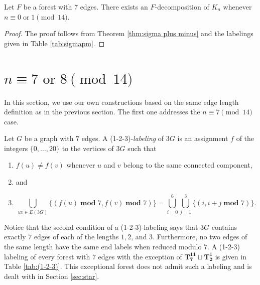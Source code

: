 \documentclass{dmgt}
\begin{document}
 


\begin{theorem}\label{thm:0 or 1 mod 14}
    Let $F$ be a forest with $7$ edges. There exists an $F$-decomposition of $K_n$ whenever $n \equiv 0 \; \textrm{or} \; 1 \pmod{14}.$
\end{theorem}
\begin{proof}
    The proof follows from Theorem \ref{thm:sigma plus minus} and the labelings given in Table \ref{tab:sigmapm}.
\end{proof}
\section{$n \equiv 7 \textrm{ or } 8 \pmod{14}$} \label{sec:7 or 8 mod 14}
In this section, we use our own constructions based on the same edge length definition as in the previous section. The first one addresses the $n \equiv 7 \pmod{14}$ case.

\begin{dnt}\label{def:1-2-3}
    Let $G$ be a graph with $7$ edges. A (1-2-3)-\emph{labeling} of $3G$ is an assignment $f$ of the integers $\{0,\dots,20\}$ to the vertices of $3G$ such that
    \begin{enumerate}
        \item $f(u) \neq f(v)$ whenever $u$ and $v$ belong to the same connected component, 
        \item[] and
        \item $$ \bigcup_{uv\in E(3G)} \{(f(u)\; \textbf{mod } 7,f(v)\; \textbf{mod } 7)\}= \bigcup_{i=0}^{6} \bigcup_{j=1}^{3} \{(i,i+j \; \textbf{mod } 7)\}.$$
    \end{enumerate}
\end{dnt}
Notice that the second condition of a (1-2-3)-labeling says that $3G$ contains exactly $7$ edges of each of the lengths $1,2$, and $3$. Furthermore, no two edges of the same length have the same end labels when reduced modulo $7.$ A (1-2-3) labeling of every forest with $7$ edges with the exception of $\mathbf{T_{7}^{11}}\sqcup\mathbf{T_{2}^{1}}$ is given in Table \ref{tab:(1-2-3)}. This exceptional forest does not admit such a labeling and is dealt with in Section \ref{sec:star}.
\end{document}
